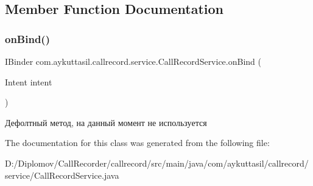 \subsection{Member Function Documentation}
\mbox{\label{classcom_1_1aykuttasil_1_1callrecord_1_1service_1_1_call_record_service_a9093beaceb138056c7cb92d9dbe67bc4}} 
\subsubsection{\texorpdfstring{on\+Bind()}{onBind()}}
{\footnotesize\ttfamily I\+Binder com.\+aykuttasil.\+callrecord.\+service.\+Call\+Record\+Service.\+on\+Bind (\begin{DoxyParamCaption}\item[{Intent}]{intent }\end{DoxyParamCaption})}

Дефолтный метод, на данный момент не используется 

The documentation for this class was generated from the following file\+:\begin{DoxyCompactItemize}
\item 
D\+:/\+Diplomov/\+Call\+Recorder/callrecord/src/main/java/com/aykuttasil/callrecord/service/Call\+Record\+Service.\+java\end{DoxyCompactItemize}
